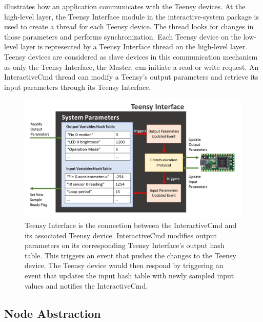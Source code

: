  illustrates how an application communicates with the Teensy devices. At the high-level layer, the Teensy Interface module in the interactive-system package is used to create a thread for each Teensy device. The thread looks for changes in those parameters and performs synchronization. Each Teensy device on the low-level layer is represented by a Teensy Interface thread on the high-level layer. Teensy devices are considered as slave devices in this communication mechanism as only the Teensy Interface, the Master, can initiate a read or write request. An InteractiveCmd thread can modify a Teensy's output parameters and retrieve its input parameters through its Teensy Interface. 

\begin{figure}[!htbp]
	\centering
	\includegraphics[width=0.9 \textwidth]{"fig/interactive control system/TeensyInterface Thread"}
	\caption[Illustration of the working of the Teensy Interface]{Teensy Interface is the connection between the InteractiveCmd and its associated Teensy device. InteractiveCmd modifies output parameters on its corresponding Teensy Interface's output hash table. This triggers an event that pushes the changes to the Teensy device. The Teensy device would then respond by triggering an event that updates the input hash table with newly sampled input values and notifies the InteractiveCmd.}
	\label{fig:TeensyInterface Thread}
\end{figure}

\FloatBarrier
\subsection{Node Abstraction}

